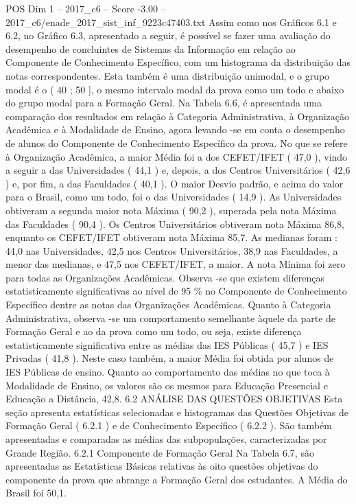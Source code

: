 \begin{textsample}{POS Dim 1 – 2017\_c6 – Score -3.00 – 2017\_c6/enade\_2017\_sist\_inf\_9223c47403.txt}
Assim como nos Gráficos 6.1 e 6.2, no Gráfico 6.3, apresentado a seguir, é possível se fazer uma avaliação do desempenho de concluintes de Sistemas da Informação em relação ao Componente de Conhecimento Específico, com um histograma da distribuição das notas correspondentes.
Esta também é uma distribuição unimodal, e o grupo modal é o ( 40 ; 50 ], o mesmo intervalo modal da prova como um todo e abaixo do grupo modal para a Formação Geral.
Na Tabela 6.6, é apresentada uma comparação dos resultados em relação à Categoria Administrativa, à Organização Acadêmica e à Modalidade de Ensino, agora levando -se em conta o desempenho de alunos do Componente de Conhecimento Específico da prova.
No que se refere à Organização Acadêmica, a maior Média foi a dos CEFET/IFET ( 47,0 ), vindo a seguir a das Universidades ( 44,1 ) e, depois, a dos Centros Universitários ( 42,6 ) e, por fim, a das Faculdades ( 40,1 ).
O maior Desvio padrão, e acima do valor para o Brasil, como um todo, foi o das Universidades ( 14,9 ).
As Universidades obtiveram a segunda maior nota Máxima ( 90,2 ), superada pela nota Máxima das Faculdades ( 90,4 ).
Os Centros Universitários obtiveram nota Máxima 86,8, enquanto os CEFET/IFET obtiveram nota Máxima 85,7.
As medianas foram : 44,0 nas Universidades, 42,5 nos Centros Universitários, 38,9 nas Faculdades, a menor das medianas, e 47,5 nos CEFET/IFET, a maior.
A nota Mínima foi zero para todas as Organizações Acadêmicas.
Observa -se que existem diferenças estatisticamente significativas ao nível de 95 \% no Componente de Conhecimento Específico dentre as notas das Organizações Acadêmicas.
Quanto à Categoria Administrativa, observa -se um comportamento semelhante àquele da parte de Formação Geral e ao da prova como um todo, ou seja, existe diferença estatisticamente significativa entre as médias das IES Públicas ( 45,7 ) e IES Privadas ( 41,8 ).
Neste caso também, a maior Média foi obtida por alunos de IES Públicas de ensino.
Quanto ao comportamento das médias no que toca à Modalidade de Ensino, os valores são os mesmos para Educação Presencial e Educação a Distância, 42,8. 6.2 ANÁLISE DAS QUESTÕES OBJETIVAS Esta seção apresenta estatísticas selecionadas e histogramas das Questões Objetivas de Formação Geral ( 6.2.1 ) e de Conhecimento Específico ( 6.2.2 ).
São também apresentadas e comparadas as médias das subpopulações, caracterizadas por Grande Região. 6.2.1 Componente de Formação Geral Na Tabela 6.7, são apresentadas as Estatísticas Básicas relativas às oito questões objetivas do componente da prova que abrange a Formação Geral dos estudantes.
A Média do Brasil foi 50,1.

\end{textsample}

